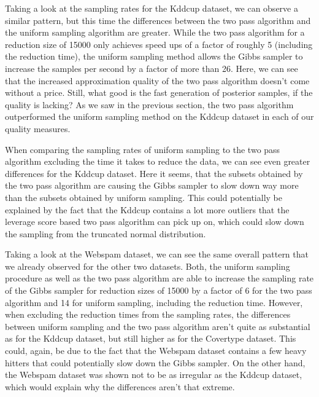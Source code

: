 Taking a look at the sampling rates for the Kddcup dataset,
we can observe a similar pattern,
but this time the differences between the two pass algorithm
and the uniform sampling algorithm are greater. While the
two pass algorithm for a reduction size of 15000
only achieves speed ups of a factor of
roughly 5 (including the reduction time), the uniform sampling
method allows the Gibbs sampler to increase the samples
per second by a factor of more than 26.
Here, we can see that the increased approximation quality of
the two pass algorithm doesn't come without a price. Still,
what good is the fast generation of posterior samples, if the
quality is lacking? As we saw in the previous section, the
two pass algorithm outperformed the uniform sampling method
on the Kddcup dataset in each of our quality measures.

When comparing the sampling rates of uniform sampling to the
two pass algorithm excluding the time it takes to reduce the data,
we can see even greater differences for the Kddcup dataset.
Here it seems, that the subsets obtained by the two pass algorithm
are causing the Gibbs sampler to slow down way more than the
subsets obtained by uniform sampling.
This could potentially be explained by the fact that the Kddcup
contains a lot more outliers that the leverage score based two
pass algorithm can pick up on, which could slow down the
sampling from the truncated normal distribution.

Taking a look at the Webspam dataset, we can
see the same overall pattern that we already observed for the
other two datasets. Both, the uniform sampling procedure as well as
the two pass algorithm are able to increase the sampling rate
of the Gibbs sampler for reduction sizes of 15000 by a factor
of 6 for the two pass algorithm and 14 for uniform sampling,
including the reduction time.
However, when excluding the reduction times from the sampling
rates, the differences between uniform sampling and the two
pass algorithm aren't quite as substantial as for the Kddcup dataset,
but still higher as for the Covertype dataset.
This could, again, be due to the fact that the Webspam dataset
contains a few heavy hitters that could potentially slow down
the Gibbs sampler. On the other hand, the Webspam dataset was
shown not to be as irregular as the Kddcup dataset, which would
explain why the differences aren't that extreme.

